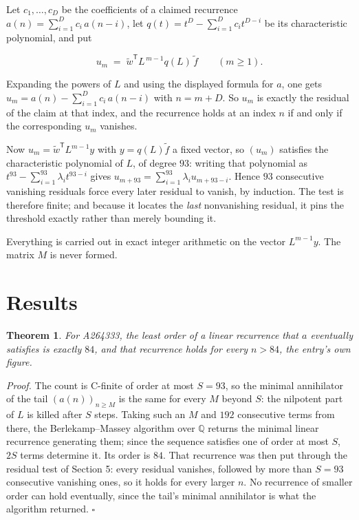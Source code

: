 \documentclass[11pt]{article}
\newtheorem{theorem}{Theorem}
\theoremstyle{definition}
\begin{document}
Let $c_1,\dots,c_D$ be the coefficients of a claimed recurrence $a(n) = \sum_{i=1}^{D} c_i\,a(n-i)$, let $q(t) = t^{D} - \sum_{i=1}^{D} c_i t^{D-i}$ be its characteristic polynomial, and put

\[u_m \;=\; \tilde w^{\mathsf T} L^{\,m-1} q(L)\,\tilde f \qquad (m \ge 1).\]

Expanding the powers of $L$ and using the displayed formula for $a$, one gets $u_m = a(n) - \sum_{i=1}^{D} c_i\,a(n-i)$ with $n = m + D$. So $u_m$ is exactly the residual of the claim at that index, and the recurrence holds at an index $n$ if and only if the corresponding $u_m$ vanishes.

Now $u_m = \tilde w^{\mathsf T} L^{m-1} y$ with $y = q(L)\tilde f$ a fixed vector, so $(u_m)$ satisfies the characteristic polynomial of $L$, of degree $93$: writing that polynomial as $t^{93} - \sum_{i=1}^{93} \lambda_i t^{93-i}$ gives $u_{m+93} = \sum_{i=1}^{93} \lambda_i u_{m+93-i}$. Hence $93$ consecutive vanishing residuals force every later residual to vanish, by induction. The test is therefore finite; and because it locates the {\itshape last} nonvanishing residual, it pins the threshold exactly rather than merely bounding it.

Everything is carried out in exact integer arithmetic on the vector $L^{m-1}y$. The matrix $M$ is never formed.

\section{Results}

\begin{theorem} For A264333, the least order of a linear recurrence that $a$ eventually satisfies is exactly $84$, and that recurrence holds for every $n > 84$, the entry's own figure.\end{theorem}

{\itshape Proof.} The count is C-finite of order at most $S = 93$, so the minimal annihilator of the tail $(a(n))_{n \ge M}$ is the same for every $M$ beyond $S$: the nilpotent part of $L$ is killed after $S$ steps. Taking such an $M$ and $192$ consecutive terms from there, the Berlekamp--Massey algorithm over $\mathbb{Q}$ returns the minimal linear recurrence generating them; since the sequence satisfies one of order at most $S$, $2S$ terms determine it. Its order is $84$. That recurrence was then put through the residual test of Section 5: every residual vanishes, followed by more than $S = 93$ consecutive vanishing ones, so it holds for every larger $n$. No recurrence of smaller order can hold eventually, since the tail's minimal annihilator is what the algorithm returned. $\square$
\end{document}
